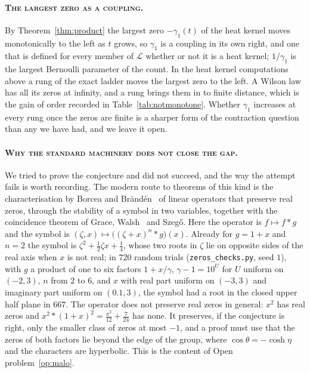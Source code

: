 \paragraph{\normalfont\scshape The largest zero as a coupling.} By Theorem~\ref{thm:product} the largest zero $-\gamma_1(t)$ of the heat kernel moves monotonically to the left as $t$ grows, so $\gamma_1$ is a coupling in its own right, and one that is defined for every member of $\mathcal L$ whether or not it is a heat kernel; $1/\gamma_1$ is the largest Bernoulli parameter of the count. In the heat kernel computations above a rung of the exact ladder moves the largest zero to the left. A Wilson law has all its zeros at infinity, and a rung brings them in to finite distance, which is the gain of order recorded in Table~\ref{tab:notmonotone}. Whether $\gamma_1$ increases at every rung once the zeros are finite is a sharper form of the contraction question than any we have had, and we leave it open.

\paragraph{\normalfont\scshape Why the standard machinery does not close the gap.} We tried to prove the conjecture and did not succeed, and the way the attempt fails is worth recording. The modern route to theorems of this kind is the characterisation by Borcea and Br\"and\'en~\cite{BB09a,BB09b} of linear operators that preserve real zeros, through the stability of a symbol in two variables, together with the coincidence theorem of Grace, Walsh~\cite{Wa22} and Szeg\H o. Here the operator is $f\mapsto f*g$ and the symbol is $(\zeta,x)\mapsto\big((\zeta+x)^n*g\big)(x)$. Already for $g=1+x$ and $n=2$ the symbol is $\zeta^2+\frac12\zeta x+\frac14$, whose two roots in $\zeta$ lie on opposite sides of the real axis when $x$ is not real; in $720$ random trials (\texttt{zeros\_checks.py}, seed $1$), with $g$ a product of one to six factors $1+x/\gamma$, $\gamma-1=10^U$ for $U$ uniform on $(-2,3)$, $n$ from $2$ to $6$, and $x$ with real part uniform on $(-3,3)$ and imaginary part uniform on $(0.1,3)$, the symbol had a root in the closed upper half plane in $667$. The operator does not preserve real zeros in general: $x^2$ has real zeros and $x^2*(1+x)^2=\frac{x^2}{12}+\frac7{24}$ has none. It preserves, if the conjecture is right, only the smaller class of zeros at most $-1$, and a proof must use that the zeros of both factors lie beyond the edge of the group, where $\cos\theta=-\cosh\eta$ and the characters are hyperbolic. This is the content of Open problem~\ref{op:malo}.

